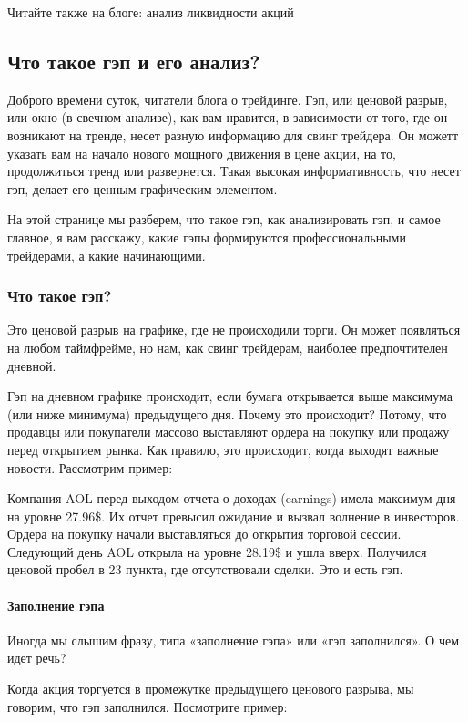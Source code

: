 \documentclass{book}
\begin{document}
Читайте также на блоге: анализ ликвидности акций

\subsection{Что такое гэп и его анализ?}

Доброго времени суток, читатели блога о трейдинге. Гэп, или ценовой разрыв, или окно (в свечном анализе), как вам нравится, в зависимости от того, где он возникают на тренде, несет разную информацию для свинг трейдера. Он можетт указать вам на начало нового мощного движения в цене акции, на то, продолжиться тренд или развернется. Такая высокая информативность, что несет гэп, делает его ценным графическим элементом.

На этой странице мы разберем, что такое гэп, как анализировать гэп, и
самое главное, я вам расскажу, какие гэпы формируются
профессиональными трейдерами, а какие начинающими.

\subsubsection{Что такое гэп?}

Это ценовой разрыв на графике, где не происходили торги. Он может появляться на любом таймфрейме, но нам, как свинг трейдерам, наиболее предпочтителен дневной.

Гэп на дневном графике происходит, если бумага открывается выше максимума (или ниже минимума) предыдущего дня. Почему это происходит? Потому, что продавцы или покупатели массово выставляют ордера на покупку или продажу перед открытием рынка. Как правило, это происходит, когда выходят важные новости. Рассмотрим пример:

Компания AOL перед выходом отчета о доходах (earnings) имела максимум
дня на уровне 27.96\$. Их отчет превысил ожидание и вызвал волнение в
инвесторов. Ордера на покупку начали выставляться до открытия торговой
сессии. Следующий день AOL открыла на уровне 28.19\$ и ушла
вверх. Получился ценовой пробел в 23 пункта, где отсутствовали
сделки. Это и есть гэп.

\paragraph{Заполнение гэпа}

Иногда мы слышим фразу, типа «заполнение гэпа» или «гэп заполнился». О чем идет речь?

Когда акция торгуется в промежутке предыдущего ценового разрыва, мы говорим, что гэп заполнился. Посмотрите пример:
\end{document}
